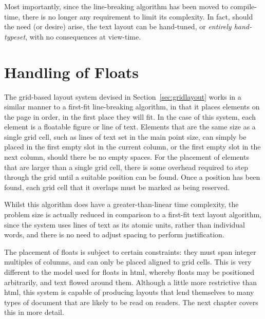 \vspace{2em}

Most importantly, since the line-breaking algorithm has been moved to compile-time, there is no longer any requirement to limit its complexity. In fact, should the need (or desire) arise, the text layout can be hand-tuned, or \emph{entirely hand-typeset}, with no consequences at view-time.


\section{Handling of Floats}

The grid-based layout system devised in Section~\ref{sec:gridlayout} works in a similar manner to a first-fit line-breaking algorithm, in that it places elements on the page in order, in the first place they will fit. In the case of this system, each element is a floatable figure or line of text. Elements that are the same size as a single grid cell, such as lines of text set in the main point size, can simply be placed in the first empty slot in the current column, or the first empty slot in the next column, should there be no empty spaces.  For the placement of elements that are larger than a single grid cell, there is some overhead required to step through the grid until a suitable position can be found. Once a position has been found, each grid cell that it overlaps must be marked as being reserved.

Whilst this algorithm does have a greater-than-linear time complexity, the problem size is actually reduced in comparison to a first-fit text layout algorithm, since the system uses lines of text as its atomic units, rather than individual words, and there is no need to adjust spacing to perform justification.

The placement of floats is subject to certain constraints: they must span integer multiples of columns, and can only be placed aligned to grid cells. This is very different to the model used for floats in \gls{html}, whereby floats may be positioned arbitrarily, and text flowed around them. Although a little more restrictive than \gls{html}, this system is capable of producing layouts that lend themselves to many types of document that are likely to be read on \ebook{} readers. The next chapter covers this in more detail.

